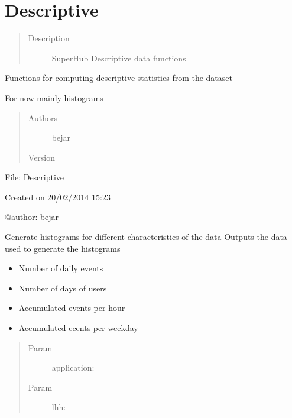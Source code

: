 \documentclass[letterpaper,10pt,english]{sphinxmanual}
\begin{document}
\section{Descriptive}
\label{index:descriptive}\begin{quote}\begin{description}
\item[{Description}] \leavevmode
SuperHub Descriptive data functions

\end{description}\end{quote}

Functions for computing descriptive statistics from the dataset

For now mainly histograms
\begin{quote}\begin{description}
\item[{Authors}] \leavevmode
bejar

\item[{Version}] 

\end{description}\end{quote}

File: Descriptive

Created on 20/02/2014 15:23

@author: bejar

\begin{fulllineitems}
\label{index:SuperHub.Descriptive.data_histograms}
Generate histograms for different characteristics of the data
Outputs the data used to generate the histograms
\begin{itemize}
\item {} 
Number of daily events

\item {} 
Number of days of users

\item {} 
Accumulated events per hour

\item {} 
Accumulated ecents per weekday

\end{itemize}
\begin{quote}\begin{description}
\item[{Param }] \leavevmode
application:

\item[{Param }] \leavevmode
lhh:

\end{description}\end{quote}

\end{fulllineitems}
\end{document}
